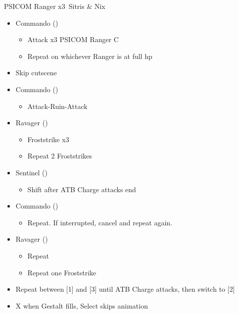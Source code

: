 \documentclass{report}
\begin{document}

\renewcommand{\first}{[1] Commando (\com)}
\renewcommand{\second}{[2] Sentinel (\sen)}
\renewcommand{\third}{[3] Ravager (\rav)}

\begin{battle}{PSICOM Ranger x3\, Sitris \& Nix}
\begin{itemize}
    \item \first
    \begin{itemize}
        \item Attack x3 PSICOM Ranger C
        \item Repeat on whichever Ranger is at full hp
    \end{itemize}
    \item Skip cutscene
    \item \first
    \begin{itemize}
        \item Attack-Ruin-Attack
    \end{itemize}
    \item \third
    \begin{itemize}
        \item Froststrike x3
        \item Repeat 2 Froststrikes
    \end{itemize}
    \item \second
    \begin{itemize}
        \item Shift after ATB Charge attacks end
    \end{itemize}
    \item \first
    \begin{itemize}
        \item Repeat. If interrupted, cancel and repeat again.
    \end{itemize}
    \item \third
    \begin{itemize}
        \item Repeat
        \item Repeat one Froststrike
    \end{itemize}
    \item Repeat between [1] and [3] until ATB Charge attacks, then switch to [2]
    \item X when Gestalt fills, Select skips animation
\end{itemize}
 
\end{battle}
\end{document}
